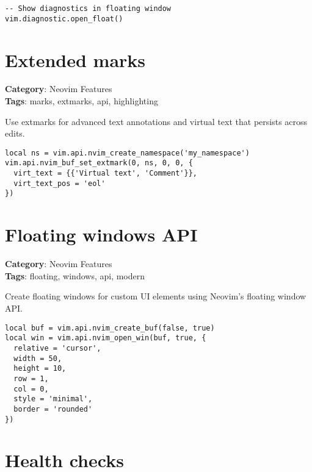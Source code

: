 {{{{{{{{{{\begin{Exa*}{}
\begin{Verbatim}[fontsize=\footnotesize, breaklines, breakanywhere]
-- Show diagnostics in floating window
vim.diagnostic.open_float()
\end{Verbatim}
\end{Exa*}

\section{Extended marks}

\textbf{Category}: Neovim Features\\ \textbf{Tags}: marks, extmarks, api, highlighting
\vspace{0.5cm}

Use extmarks for advanced text annotations and virtual text that persists across edits.

\begin{Exa*}{}
\begin{Verbatim}[fontsize=\footnotesize, breaklines, breakanywhere]
local ns = vim.api.nvim_create_namespace('my_namespace')
vim.api.nvim_buf_set_extmark(0, ns, 0, 0, {
  virt_text = {{'Virtual text', 'Comment'}},
  virt_text_pos = 'eol'
})
\end{Verbatim}
\end{Exa*}

\section{Floating windows API}

\textbf{Category}: Neovim Features\\ \textbf{Tags}: floating, windows, api, modern
\vspace{0.5cm}

Create floating windows for custom UI elements using Neovim's floating window API.

\begin{Exa*}{}
\begin{Verbatim}[fontsize=\footnotesize, breaklines, breakanywhere]
local buf = vim.api.nvim_create_buf(false, true)
local win = vim.api.nvim_open_win(buf, true, {
  relative = 'cursor',
  width = 50,
  height = 10,
  row = 1,
  col = 0,
  style = 'minimal',
  border = 'rounded'
})
\end{Verbatim}
\end{Exa*}

\section{Health checks}

}}}}}}}}}}
